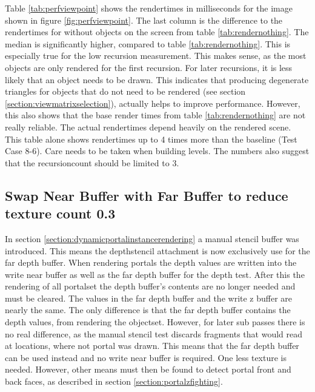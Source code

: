 Table \ref{tab:perfviewpoint} shows the rendertimes in milliseconds for the image shown in figure \ref{fig:perfviewpoint}. The last column is the difference to the rendertimes for without objects on the screen from table \ref{tab:rendernothing}. The median is significantly higher, compared to table \ref{tab:rendernothing}. This is especially true for the low recursion measurement. This makes sense, as the most objects are only rendered for the first recursion. For later recursions, it is less likely that an object needs to be drawn. This indicates that producing degenerate triangles for objects that do not need to be rendered (see section \ref{section:viewmatrixselection}), actually helps to improve performance. However, this also shows that the base render times from table \ref{tab:rendernothing} are not really reliable. The actual rendertimes depend heavily on the rendered scene. This table alone shows rendertimes up to 4 times more than the baseline (Test Case 8-6). Care needs to be taken when building levels. The numbers also suggest that the \gls{recursioncount} should be limited to 3.


\subsection{Swap Near Buffer with Far Buffer to reduce texture count 0.3}

In section \ref{section:dynamicportalinstancerendering} a manual stencil buffer was introduced. This means the depthstencil attachment is now exclusively use for the far depth buffer. When rendering portals the depth values are written into the write near buffer as well as the far depth buffer for the depth test. After this the rendering of all \gls{portalset} the depth buffer's contents are no longer needed and must be cleared. The values in the far depth buffer and the write z buffer are nearly the same. The only difference is that the far depth buffer contains the depth values, from rendering the \gls{objectset}. However, for later sub passes there is no real difference, as the manual stencil test discards fragments that would read at locations, where not portal was drawn. This means that the far depth buffer can be used instead and no write near buffer is required. One less texture is needed. However, other means must then be found to detect portal front and back faces, as described in section \ref{section:portalzfighting}.



